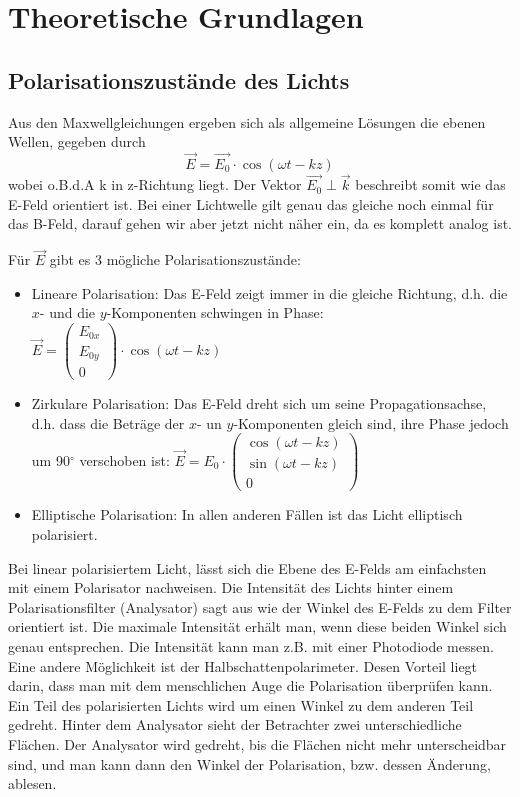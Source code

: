 \section{Theoretische Grundlagen}

\subsection{Polarisationszustände des Lichts}

Aus den Maxwellgleichungen ergeben sich als allgemeine Lösungen die ebenen Wellen, gegeben durch
$$\vec E = \vec{E_0}\cdot \cos(\omega t - kz)$$
wobei o.B.d.A k in z-Richtung liegt. Der Vektor $\vec{E_0} \perp \vec k$ beschreibt somit wie das E-Feld orientiert ist. Bei einer Lichtwelle gilt genau das gleiche noch einmal für das B-Feld, darauf gehen wir aber jetzt nicht näher ein, da es komplett analog ist.

Für $\vec{E}$ gibt es 3 mögliche Polarisationszustände:

\begin{itemize}

\item Lineare Polarisation: Das E-Feld zeigt immer in die gleiche Richtung, d.h. die $x$- und die $y$-Komponenten schwingen in Phase:
$ \vec{E} = \begin{pmatrix} E_{0x} \\ E_{0y} \\ 0 \end{pmatrix}\cdot\cos(\omega t-kz) $

\item Zirkulare Polarisation: Das E-Feld dreht sich um seine Propagationsachse, d.h. dass die Beträge der $x$- un $y$-Komponenten gleich sind, ihre Phase jedoch um 90$^\circ$ verschoben ist:
$\vec{E}= E_0\cdot \begin{pmatrix} \cos(\omega t - kz) \\ \sin(\omega t - kz) \\ 0 \end{pmatrix}$

\item Elliptische Polarisation: In allen anderen Fällen ist das Licht elliptisch polarisiert.
\end{itemize}

Bei linear polarisiertem Licht, lässt sich die Ebene des E-Felds am einfachsten mit einem Polarisator nachweisen. Die Intensität des Lichts hinter einem Polarisationsfilter (Analysator) sagt aus wie der Winkel des E-Felds zu dem Filter orientiert ist. Die maximale Intensität erhält man, wenn diese beiden Winkel sich genau entsprechen. Die Intensität kann man z.B. mit einer Photodiode messen.
Eine andere Möglichkeit ist der Halbschattenpolarimeter. Desen Vorteil liegt darin, dass man mit dem menschlichen Auge die Polarisation überprüfen kann. Ein Teil des polarisierten Lichts wird um einen Winkel zu dem anderen Teil gedreht. Hinter dem Analysator sieht der Betrachter zwei unterschiedliche Flächen. Der Analysator wird gedreht, bis die Flächen nicht mehr unterscheidbar sind, und man kann dann den Winkel der Polarisation, bzw. dessen Änderung, ablesen.




